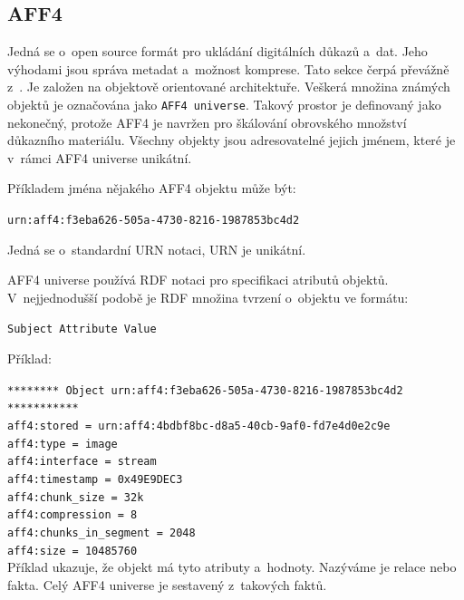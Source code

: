 \subsection{AFF4}
Jedná se o~open source formát pro ukládání digitálních důkazů a~dat. Jeho výhodami jsou správa metadat a~možnost komprese. Tato sekce čerpá převážně z~\cite{aff4}. Je založen na objektově orientované architektuře. Veškerá množina známých objektů je označována jako \texttt{AFF4 universe}. Takový prostor je definovaný jako nekonečný, protože AFF4 je navržen pro škálování obrovského množství důkazního materiálu. Všechny objekty jsou adresovatelné jejich jménem, které je v~rámci AFF4 universe unikátní.

\vspace{0.5cm}

\noindent Příkladem jména nějakého AFF4 objektu může být:

\texttt{urn:aff4:f3eba626-505a-4730-8216-1987853bc4d2}

\noindent Jedná se o~standardní URN notaci, URN je unikátní.

\vspace{0.5cm}

\noindent AFF4 universe používá RDF notaci pro specifikaci atributů objektů. V~nejjednodušší podobě je RDF množina tvrzení o~objektu ve formátu:

\texttt{Subject   Attribute   Value}

\vspace{0.5cm}

\noindent Příklad:

\noindent \texttt{******** Object urn:aff4:f3eba626-505a-4730-8216-1987853bc4d2 ***********}\\
\texttt{aff4:stored = urn:aff4:4bdbf8bc-d8a5-40cb-9af0-fd7e4d0e2c9e}\\
\texttt{aff4:type = image}\\
\texttt{aff4:interface = stream}\\
\texttt{aff4:timestamp = 0x49E9DEC3}\\
\texttt{aff4:chunk\_size = 32k}\\
\texttt{aff4:compression = 8}\\
\texttt{aff4:chunks\_in\_segment = 2048}\\
\texttt{aff4:size = 10485760}\\

\noindent Příklad ukazuje, že objekt má tyto atributy a~hodnoty. Nazýváme je relace nebo fakta. Celý AFF4 universe je sestavený z~takových faktů.

